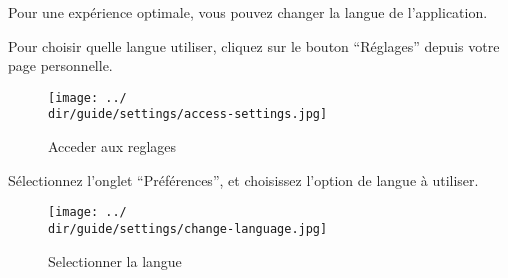 Pour une expérience optimale, vous pouvez changer la langue de l’application.

Pour choisir quelle langue utiliser, cliquez sur le bouton “Réglages” depuis votre page personnelle.

\begin{figure}[H]
	\texttt{[image: ../\\dir/guide/settings/access-settings.jpg]}
	\caption{Acceder aux reglages}
\end{figure}

Sélectionnez l’onglet “Préférences”, et choisissez l’option de langue à utiliser.

\begin{figure}[H]
	\texttt{[image: ../\\dir/guide/settings/change-language.jpg]}
	\caption{Selectionner la langue}
\end{figure}
